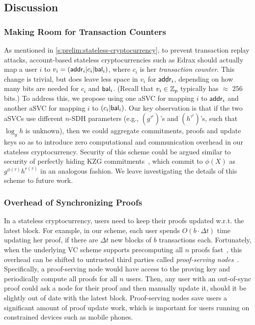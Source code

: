 \subsection{Discussion}

\subsubsection{Making Room for Transaction Counters}
\label{s:discussion:txn-counters}
As mentioned in \cref{s:prelim:stateless-cryptocurrency}, to prevent transaction replay attacks, account-based stateless cryptocurrencies such as Edrax should actually map a user $i$ to $v_i = (\mathsf{addr}_i\vert c_i\vert\mathsf{bal}_i)$, where $c_i$ is her \textit{transaction counter}.
This change is trivial, but does leave less space in $v_i$ for $\mathsf{addr}_i$, depending on how many bits are needed for $c_i$ and $\mathsf{bal}_i$.
(Recall that $v_i\in\mathbb{Z}_p$ typically has $\approx$ 256 bits.)
To address this, we propose using one aSVC for mapping $i$ to $\mathsf{addr}_i$ and another aSVC for mapping $i$ to $(c_i\vert\mathsf{bal}_i)$.
Our key observation is that if the two aSVCs use different $n$-SDH parameters (e.g., $(g^{\tau^i})$'s and $(h^{\tau^i})$'s, such that $\log_g{h}$ is unknown), then we could aggregate commitments, proofs and update keys so as to introduce zero computational and communication overhead in our stateless cryptocurrency.
Security of this scheme could be argued similar to security of perfectly hiding KZG commitments~\cite{KZG10a}, which commit to $\phi(X)$ as $g^{\phi(\tau)}h^{r(\tau)}$ in an analogous fashion.
We leave investigating the details of this scheme to future work.

\subsubsection{Overhead of Synchronizing Proofs}
\label{s:stateless-cryptocurrency:proof-serving-nodes}
In a stateless cryptocurrency, users need to keep their proofs updated w.r.t. the latest block.
For example, in our scheme, each user spends $O(b\cdot \Delta{t})$ time updating her proof, if there are $\Delta{t}$ new blocks of $b$ transactions each.
Fortunately, when the underlying VC scheme supports precomputing all $n$ proofs fast~\cite{Tomescu20}, this overhead can be shifted to untrusted third parties called \textit{proof-serving nodes}~\cite{CPZ18}.
Specifically, a proof-serving node would have access to the proving key \prk and periodically compute all proofs for all $n$ users.
Then, any user with an out-of-sync proof could ask a node for their proof and then manually update it, should it be slightly out of date with the latest block.
Proof-serving nodes save users a significant amount of proof update work, which is important for users running on constrained devices such as mobile phones.
